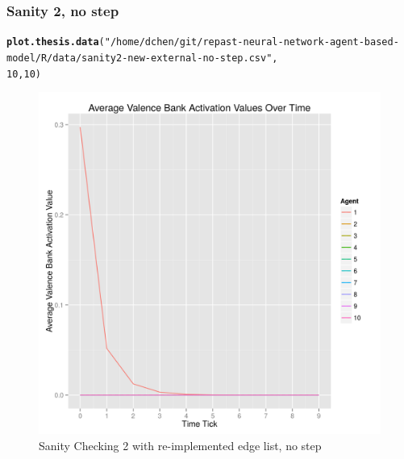 \documentclass{article}\usepackage[]{graphicx}\usepackage[]{color}
\makeatletter
\def\maxwidth{ %
  \ifdim\Gin@nat@width>\linewidth
    \linewidth
  \else
    \Gin@nat@width
  \fi
}
\newcommand{\hlnum}[1]{\textcolor[rgb]{0.686,0.059,0.569}{#1}}%
\newcommand{\hlstr}[1]{\textcolor[rgb]{0.192,0.494,0.8}{#1}}%
\newcommand{\hlstd}[1]{\textcolor[rgb]{0.345,0.345,0.345}{#1}}%
\newcommand{\hlkwd}[1]{\textcolor[rgb]{0.737,0.353,0.396}{\textbf{#1}}}%
\newenvironment{kframe}{%
 \def\at@end@of@kframe{}%
 \ifinner\ifhmode%
  \def\at@end@of@kframe{\end{minipage}}%
  \begin{minipage}{\columnwidth}%
 \fi\fi%
 \def\FrameCommand##1{\hskip\@totalleftmargin \hskip-\fboxsep
 \colorbox{shadecolor}{##1}\hskip-\fboxsep
     \hskip-\linewidth \hskip-\@totalleftmargin \hskip\columnwidth}%
 \MakeFramed {\advance\hsize-\width
   \@totalleftmargin\z@ \linewidth\hsize
   \@setminipage}}%
 {\par\unskip\endMakeFramed%
 \at@end@of@kframe}
\newenvironment{knitrout}{}{} %
\makeatother
\begin{document}
\subsubsection{Sanity 2, no step}
\begin{knitrout}
\color{fgcolor}\begin{kframe}
\begin{alltt}
\hlkwd{plot.thesis.data}\hlstd{(}\hlstr{"/home/dchen/git/repast-neural-network-agent-based-model/R/data/sanity2-new-external-no-step.csv"}\hlstd{,}
    \hlnum{10}\hlstd{,} \hlnum{10}\hlstd{)}
\end{alltt}
\end{kframe}\begin{figure}[]

\includegraphics[width=\maxwidth]{figure/plot-sanity-2-v2-nostep} \caption[Sanity Checking 2 with re-implemented edge list, no step]{Sanity Checking 2 with re-implemented edge list, no step\label{fig:plot-sanity-2-v2-nostep}}
\end{figure}


\end{knitrout}


\newpage
\end{document}
